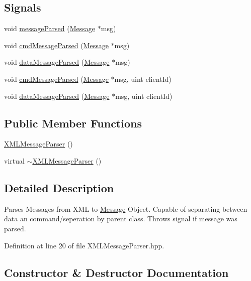 \subsection*{Signals}
\begin{DoxyCompactItemize}
\item 
void \hyperlink{class_x_m_l_message_parser_a1bb70af94b181f3f0696e7181c0c63dd}{message\+Parsed} (\hyperlink{class_message}{Message} $\ast$msg)
\item 
void \hyperlink{class_x_m_l_message_parser_af2c240a3dd79ad5afc223208bf0f0179}{cmd\+Message\+Parsed} (\hyperlink{class_message}{Message} $\ast$msg)
\item 
void \hyperlink{class_x_m_l_message_parser_aac6080abe8de2c74fbb335251c928ac6}{data\+Message\+Parsed} (\hyperlink{class_message}{Message} $\ast$msg)
\item 
void \hyperlink{class_x_m_l_message_parser_a6590080c887b3a26ad671eb6eac0ca0f}{cmd\+Message\+Parsed} (\hyperlink{class_message}{Message} $\ast$msg, uint client\+Id)
\item 
void \hyperlink{class_x_m_l_message_parser_a733b137cf8e7d66bf04beeaeac7fa0c5}{data\+Message\+Parsed} (\hyperlink{class_message}{Message} $\ast$msg, uint client\+Id)
\end{DoxyCompactItemize}
\subsection*{Public Member Functions}
\begin{DoxyCompactItemize}
\item 
\hyperlink{class_x_m_l_message_parser_af52b0b980f36eebfd1b4d0561d4d3fb9}{X\+M\+L\+Message\+Parser} ()
\item 
virtual \hyperlink{class_x_m_l_message_parser_a20e9e81f3675635ec3f5ea720b040a41}{$\sim$\+X\+M\+L\+Message\+Parser} ()
\end{DoxyCompactItemize}


\subsection{Detailed Description}
Parses Messages from X\+M\+L to \hyperlink{class_message}{Message} Object. Capable of separating between data an command/seperation by parent class. Throws signal if message was parsed. 

Definition at line 20 of file X\+M\+L\+Message\+Parser.\+hpp.



\subsection{Constructor \& Destructor Documentation}
\hypertarget{class_x_m_l_message_parser_af52b0b980f36eebfd1b4d0561d4d3fb9}{}
